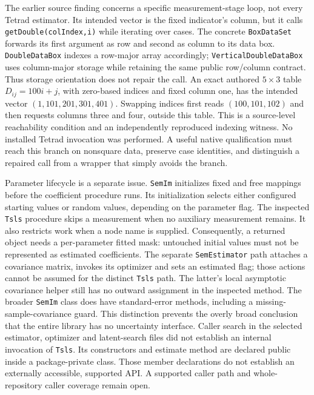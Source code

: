 The earlier source finding concerns a specific measurement-stage loop, not every Tetrad estimator. Its intended vector is the fixed indicator's column, but it calls \texttt{getDouble(colIndex,i)} while iterating over cases. The concrete \texttt{BoxDataSet} forwards its first argument as row and second as column to its data box. \texttt{DoubleDataBox} indexes a row-major array accordingly; \texttt{VerticalDoubleDataBox} uses column-major storage while retaining the same public row/column contract. Thus storage orientation does not repair the call. An exact authored $5\times3$ table $D_{ij}=100i+j$, with zero-based indices and fixed column one, has the intended vector $(1,101,201,301,401)$. Swapping indices first reads $(100,101,102)$ and then requests columns three and four, outside this table. This is a source-level reachability condition and an independently reproduced indexing witness. No installed Tetrad invocation was performed. A useful native qualification must reach this branch on nonsquare data, preserve case identities, and distinguish a repaired call from a wrapper that simply avoids the branch.~\citep{exec25_javaiv_tetrad,exec25_javaiv_choice}

Parameter lifecycle is a separate issue. \texttt{SemIm} initializes fixed and free mappings before the coefficient procedure runs. Its initialization selects either configured starting values or random values, depending on the parameter flag. The inspected \texttt{Tsls} procedure skips a measurement when no auxiliary measurement remains. It also restricts work when a node name is supplied. Consequently, a returned object needs a per-parameter fitted mask: untouched initial values must not be represented as estimated coefficients. The separate \texttt{SemEstimator} path attaches a covariance matrix, invokes its optimizer and sets an estimated flag; those actions cannot be assumed for the distinct \texttt{Tsls} path. The latter's local asymptotic covariance helper still has no outward assignment in the inspected method. The broader \texttt{SemIm} class does have standard-error methods, including a missing-sample-covariance guard. This distinction prevents the overly broad conclusion that the entire library has no uncertainty interface. Caller search in the selected estimator, optimizer and latent-search files did not establish an internal invocation of \texttt{Tsls}. Its constructors and estimate method are declared public inside a package-private class. Those member declarations do not establish an externally accessible, supported API. A supported caller path and whole-repository caller coverage remain open.~\citep{exec25_javaiv_tetrad,exec22_java_latent_iv_preflight}

